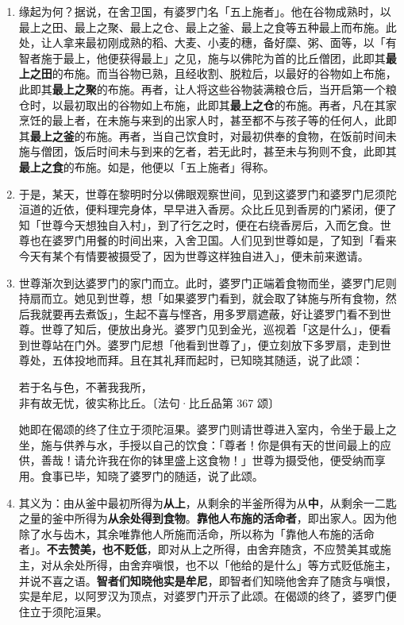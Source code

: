 \begin{enumerate}\item 缘起为何？据说，在舍卫国，有婆罗门名「五上施者」。他在谷物成熟时，以最上之田、最上之聚、最上之仓、最上之釜、最上之食等五种最上而布施。此处，让人拿来最初刚成熟的稻、大麦、小麦的穗，备好糜、粥、面等，以「有智者施于最上，他便获得最上」之见，施与以佛陀为首的比丘僧团，此即其\textbf{最上之田}的布施。而当谷物已熟，且经收割、脱粒后，以最好的谷物如上布施，此即其\textbf{最上之聚}的布施。再者，让人将这些谷物装满粮仓后，当开启第一个粮仓时，以最初取出的谷物如上布施，此即其\textbf{最上之仓}的布施。再者，凡在其家烹饪的最上者，在未施与来到的出家人时，甚至都不与孩子等的任何人，此即其\textbf{最上之釜}的布施。再者，当自己饮食时，对最初供奉的食物，在饭前时间未施与僧团，饭后时间未与到来的乞者，若无此时，甚至未与狗则不食，此即其\textbf{最上之食}的布施。如是，他便以「五上施者」得称。
\item 于是，某天，世尊在黎明时分以佛眼观察世间，见到这婆罗门和婆罗门尼须陀洹道的近依，便料理完身体，早早进入香房。众比丘见到香房的门紧闭，便了知「世尊今天想独自入村」，到了行乞之时，便在右绕香房后，入而乞食。世尊也在婆罗门用餐的时间出来，入舍卫国。人们见到世尊如是，了知到「看来今天有某个有情要被摄受了，因为世尊这样独自进入」，便未前来邀请。
\item 世尊渐次到达婆罗门的家门而立。此时，婆罗门正端着食物而坐，婆罗门尼则持扇而立。她见到世尊，想「如果婆罗门看到，就会取了钵施与所有食物，然后我就要再去煮饭」，生起不喜与悭吝，用多罗扇遮蔽，好让婆罗门看不到世尊。世尊了知后，便放出身光。婆罗门见到金光，巡视着「这是什么」，便看到世尊站在门外。婆罗门尼想「他看到世尊了」，便立刻放下多罗扇，走到世尊处，五体投地而拜。且在其礼拜而起时，已知晓其随适，说了此颂：\begin{quoting}若于名与色，不著我我所，\\非有故无忧，彼实称比丘。{\bluefootnotesize 〔法句·比丘品第 367 颂〕}\end{quoting}她即在偈颂的终了住立于须陀洹果。婆罗门则请世尊进入室内，令坐于最上之坐，施与供养与水，手授以自己的饮食：「尊者！你是俱有天的世间最上的应供，善哉！请允许我在你的钵里盛上这食物！」世尊为摄受他，便受纳而享用。食事已毕，知晓了婆罗门的随适，说了此颂。
\item 其义为：由从釜中最初所得为\textbf{从上}，从剩余的半釜所得为从\textbf{中}，从剩余一二匙之量的釜中所得为\textbf{从余处得到食物}。\textbf{靠他人布施的活命者}，即出家人。因为他除了水与齿木，其余唯靠他人所施而活命，所以称为「靠他人布施的活命者」。\textbf{不去赞美，也不贬低}，即对从上之所得，由舍弃随贪，不应赞美其或施主，对从余处所得，由舍弃嗔恨，也不以「他给的是什么」等方式贬低施主，并说不喜之语。\textbf{智者们知晓他实是牟尼}，即智者们知晓他舍弃了随贪与嗔恨，实是牟尼，以阿罗汉为顶点，对婆罗门开示了此颂。在偈颂的终了，婆罗门便住立于须陀洹果。\end{enumerate}

